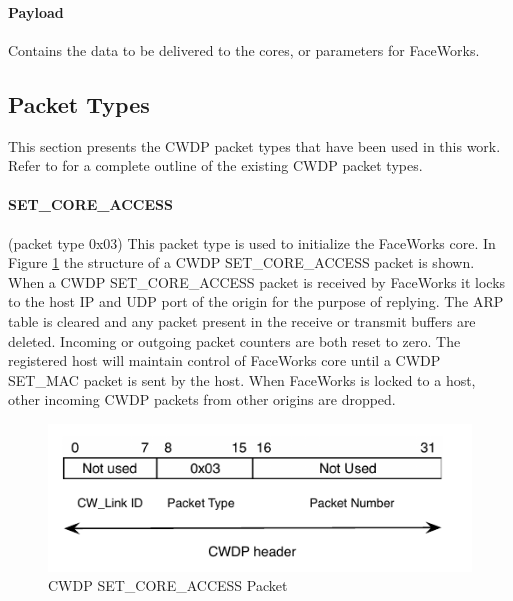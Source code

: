 \documentclass[defaultstyle,10pt,master,Helvetica]{thesis}
\begin{document}
\paragraph*{Payload} Contains the data to be delivered to the cores, or parameters for FaceWorks.

\subsection{Packet Types}

This section presents the \ac{CWDP} packet types that have been used in this work. Refer to \cite{Facedata} for a complete outline of the existing CWDP packet types.

\paragraph*{SET\_CORE\_ACCESS} (packet type 0x03) This packet type is used to initialize the FaceWorks core. In Figure \ref{fig:cwdp-core-access} the structure of a \ac{CWDP} SET\_CORE\_ACCESS packet is shown. When a \ac{CWDP} SET\_CORE\_ACCESS packet is received by FaceWorks it locks to the host \ac{IP} and \ac{UDP} port of the origin for the purpose of replying. The \ac{ARP} table is cleared and any packet present in the receive or transmit buffers are deleted. Incoming or outgoing packet counters are both reset to zero. The registered host will maintain control of FaceWorks core until a \ac{CWDP} SET\_MAC packet is sent by the host. When FaceWorks is locked to a host, other incoming \ac{CWDP} packets from other origins are dropped.


\begin{figure}[h]
  \centering
      \includegraphics[scale=1]{Diagrams/CWDP-Set-core-access.pdf}
  \caption{\ac{CWDP} SET\_CORE\_ACCESS Packet}
  \label{fig:cwdp-core-access}
\end{figure}
\end{document}
